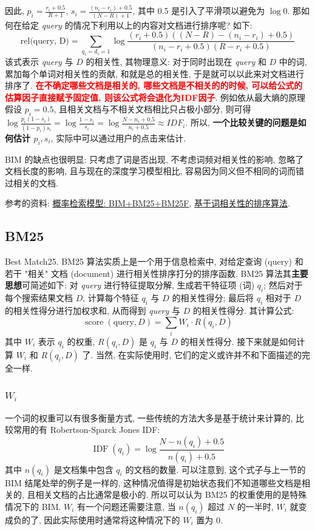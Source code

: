 因此, $p_i = \frac{r_i + 0.5}{R+1}$, $s_i = \frac{(n_i - r_i) + 0.5 }{(N - R) + 1}$, 其中 0.5 是引入了平滑项以避免为 $\log 0$. 那如何在给定 \textit{query} 的情况下利用以上的内容对文档进行排序呢? 如下:
$$
\text{rel(query, D)} = \sum_{q_{i}=d_{i}=1} \log \frac{\left(r_{i}+0.5\right)\left((N-R)-\left(n_{i}-r_{i}\right)+0.5\right)}{\left(n_{i}-r_{i}+0.5\right)\left(R-r_{i}+0.5\right)}
$$
该式表示 \textit{query} 与 $D$ 的相关性, 其物理意义: 对于同时出现在 \textit{query} 和 $D$ 中的词, 累加每个单词对相关性的贡献, 和就是总的相关性, 于是就可以以此来对文档进行排序了. \textbf{\textcolor{red}{在不确定哪些文档是相关的, 哪些文档是不相关的的时候, 可以给公式的估算因子直接赋予固定值, 则该公式将会退化为IDF因子}}. 例如依从最大熵的原理假设 $p_i = 0.5$, 且相关文档与不相关文档相比只占极小部分, 则可得 $\log \frac{p_i (1 - s_i)}{(1 - p_i) s_i} = \log \frac{1 - s_i}{s_i} = \log \frac{N - n_i + 0.5}{n_i + 0.5} \approx IDF_i$. 所以, \textbf{一个比较关键的问题是如何估计 $p_i, s_i$}, 实际中可以通过用户的点击来估计.

BIM 的缺点也很明显: 只考虑了词是否出现, 不考虑词频对相关性的影响, 忽略了文档长度的影响, 且与现在的深度学习模型相比, 容易因为同义但不相同的词而错过相关的文档.

参考的资料: \href{https://www.cnblogs.com/bentuwuying/p/6730891.html}{概率检索模型: BIM+BM25+BM25F}, \href{https://blog.csdn.net/SrdLaplace/article/details/84954920}{基于词相关性的排序算法}.

\subsection{BM25}
Best Match25. BM25 算法实质上是一个用于信息检索中, 对给定查询 (query) 和若干 "相关" 文档 (document) 进行相关性排序打分的排序函数. BM25 算法其\textbf{主要思想}可简述如下: 对 \textit{query} 进行特征提取分解, 生成若干特征项 (词) $q_i$; 然后对于每个搜索结果文档 $D$, 计算每个特征 $q_i$ 与 $D$ 的相关性得分; 最后将 $q_i$ 相对于 $D$ 的相关性得分进行加权求和, 从而得到 \textit{query} 与 $D$ 的相关性得分. 其计算公式:
$$
\operatorname{score}(\text{query}, D)=\sum_{i} W_{i} \cdot R\left(q_{i}, D\right)
$$
其中 $W_i$ 表示 $q_i$ 的权重, $R(q_i, D)$ 是 $q_i$ 与 $D$ 的相关性得分. 接下来就是如何计算 $W_i$ 和 $R(q_i, D)$ 了. 当然, 在实际使用时, 它们的定义或许并不和下面描述的完全一样.

\subsubsection{$W_i$}
一个词的权重可以有很多衡量方式, 一些传统的方法大多是基于统计来计算的, 比较常用的有 Robertson-Sparck Jones IDF:
$$
\operatorname{IDF}\left(q_{i}\right)=\log \frac{N-n\left(q_{i}\right)+0.5}{n\left(q_{i}\right)+0.5}
$$
其中 $n(q_i)$ 是文档集中包含 $q_i$ 的文档的数量. 可以注意到, 这个式子与上一节的 BIM 结尾处举的例子是一样的, 这种情况值得是初始状态我们不知道哪些文档是相关的, 且相关文档的占比通常是极小的. 所以可以认为 BM25 的权重使用的是特殊情况下的 BIM. $W_i$ 有一个问题还需要注意, 当 $n(q_i)$ 超过 $N$ 的一半时, $W_i$ 就变成负的了, 因此实际使用时通常将这种情况下的 $W_i$ 置为 0.



